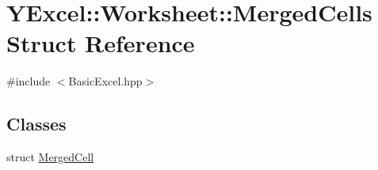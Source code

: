 \hypertarget{struct_y_excel_1_1_worksheet_1_1_merged_cells}{}\section{Y\+Excel\+:\+:Worksheet\+:\+:Merged\+Cells Struct Reference}
\label{struct_y_excel_1_1_worksheet_1_1_merged_cells}


{\ttfamily \#include $<$Basic\+Excel.\+hpp$>$}

\subsection*{Classes}
\begin{DoxyCompactItemize}
\item 
struct \hyperlink{struct_y_excel_1_1_worksheet_1_1_merged_cells_1_1_merged_cell}{Merged\+Cell}
\end{DoxyCompactItemize}

